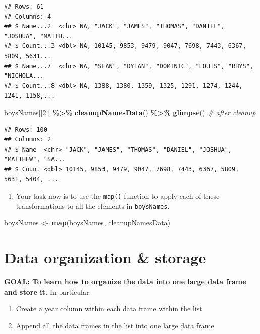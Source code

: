 \documentclass[
]{book}
\newenvironment{Shaded}{\begin{snugshade}}{\end{snugshade}}
\newcommand{\CommentTok}[1]{\textcolor[rgb]{0.56,0.35,0.01}{\textit{#1}}}
\newcommand{\DecValTok}[1]{\textcolor[rgb]{0.00,0.00,0.81}{#1}}
\newcommand{\KeywordTok}[1]{\textcolor[rgb]{0.13,0.29,0.53}{\textbf{#1}}}
\newcommand{\NormalTok}[1]{#1}
\newcommand{\OperatorTok}[1]{\textcolor[rgb]{0.81,0.36,0.00}{\textbf{#1}}}
\newcommand{\StringTok}[1]{\textcolor[rgb]{0.31,0.60,0.02}{#1}}
\providecommand{\tightlist}{%
  \setlength{\itemsep}{0pt}\setlength{\parskip}{0pt}}
\begin{document}
\begin{alert}
\begin{verbatim}
## Rows: 61
## Columns: 4
## $ Name...2  <chr> NA, "JACK", "JAMES", "THOMAS", "DANIEL", "JOSHUA", "MATTH...
## $ Count...3 <dbl> NA, 10145, 9853, 9479, 9047, 7698, 7443, 6367, 5809, 5631...
## $ Name...7  <chr> NA, "SEAN", "DYLAN", "DOMINIC", "LOUIS", "RHYS", "NICHOLA...
## $ Count...8 <dbl> NA, 1388, 1380, 1359, 1325, 1291, 1274, 1244, 1241, 1158,...
\end{verbatim}

\begin{Shaded}
\begin{Highlighting}[]
\NormalTok{boysNames[[}\DecValTok{2}\NormalTok{]] }\OperatorTok{\%\textgreater{}\%}\StringTok{ }\KeywordTok{cleanupNamesData}\NormalTok{() }\OperatorTok{\%\textgreater{}\%}\StringTok{ }\KeywordTok{glimpse}\NormalTok{() }\CommentTok{\# after cleanup}
\end{Highlighting}
\end{Shaded}

\begin{verbatim}
## Rows: 100
## Columns: 2
## $ Name  <chr> "JACK", "JAMES", "THOMAS", "DANIEL", "JOSHUA", "MATTHEW", "SA...
## $ Count <dbl> 10145, 9853, 9479, 9047, 7698, 7443, 6367, 5809, 5631, 5404, ...
\end{verbatim}

\begin{enumerate}
\def\labelenumi{\arabic{enumi}.}
\setcounter{enumi}{1}
\tightlist
\item
  Your task now is to use the \texttt{map()} function to apply each of these transformations to all the elements in \texttt{boysNames}.
\end{enumerate}

\begin{Shaded}
\begin{Highlighting}[]
\NormalTok{boysNames \textless{}{-}}\StringTok{ }\KeywordTok{map}\NormalTok{(boysNames, cleanupNamesData)}
\end{Highlighting}
\end{Shaded}

\end{alert}

\hypertarget{data-organization-storage}{%
\section{Data organization \& storage}\label{data-organization-storage}}

\begin{alert}

\textbf{GOAL: To learn how to organize the data into one large data frame and store it.} In particular:

\begin{enumerate}
\def\labelenumi{\arabic{enumi}.}
\tightlist
\item
  Create a year column within each data frame within the list
\item
  Append all the data frames in the list into one large data frame
\end{enumerate}

\end{alert}
\end{document}

